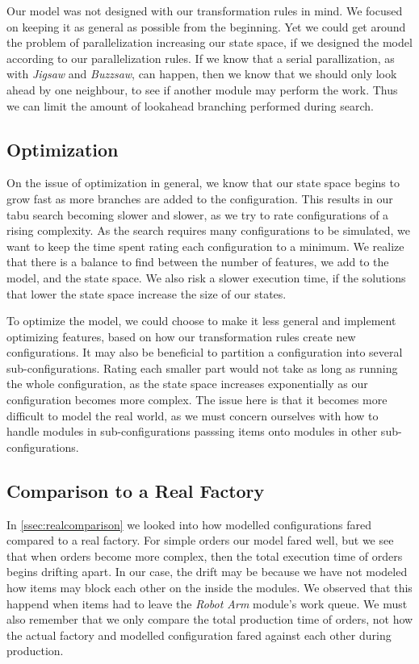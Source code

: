 Our model was not designed with our transformation rules in mind. We focused on keeping it as general as possible from the beginning. Yet we could get around the problem of parallelization increasing our state space, if we designed the model according to our parallelization rules. If we know that a serial parallization, as with \textit{Jigsaw} and \textit{Buzzsaw}, can happen, then we know that we should only look ahead by one neighbour, to see if another module may perform the work. Thus we can limit the amount of lookahead branching performed during search.   

\subsection{Optimization}
On the issue of optimization in general, we know that our state space begins to grow fast as more branches are added to the configuration. This results in our tabu search becoming slower and slower, as we try to rate configurations of a rising complexity. As the search requires many configurations to be simulated, we want to keep the time spent rating each configuration to a minimum. We realize that there is a balance to find between the number of features, we add to the model, and the state space. We also risk a slower execution time, if the solutions that lower the state space increase the size of our states.

To optimize the model, we could choose to make it less general and implement optimizing features, based on how our transformation rules create new configurations. It may also be beneficial to partition a configuration into several sub-configurations. Rating each smaller part would not take as long as running the whole configuration, as the state space increases exponentially as our configuration becomes more complex. The issue here is that it becomes more difficult to model the real world, as we must concern ourselves with how to handle modules in sub-configurations passsing items onto modules in other sub-configurations. 

\subsection{Comparison to a Real Factory}
In \cref{ssec:realcomparison} we looked into how modelled configurations fared compared to a real factory. For simple orders our model fared well, but we see that when orders become more complex, then the total execution time of orders begins drifting apart. In our case, the drift may be because we have not modeled how items may block each other on the inside the modules. We observed that this happend when items had to leave the \textit{Robot Arm} module's work queue. We must also remember that we only compare the total production time of orders, not how the actual factory and modelled configuration fared against each other during production.

